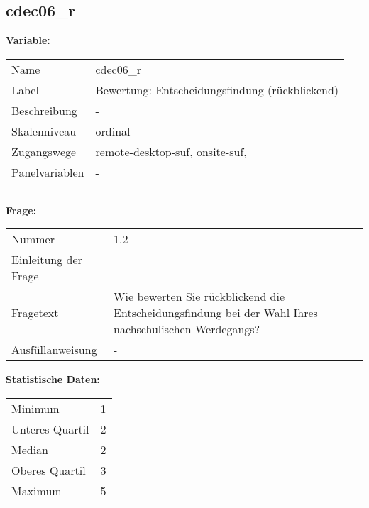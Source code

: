 	
	
	\subsection{cdec06\_r}
	\label{subSection:cdec06_r}

	\noindent\textbf{Variable:}\\
		\begin{tabular}{lL{11.3cm}}
			\label{tableVariable:cdec06_r}
			Name & cdec06\_r \\
			Label & Bewertung: Entscheidungsfindung (rückblickend) \\
			Beschreibung & - \\
			Skalenniveau & ordinal \\
			Zugangswege &
				remote-desktop-suf,
				onsite-suf,
 \\
			Panelvariablen & -
			 \\
			 \\
 \\
		\end{tabular}

		\vspace*{1 cm}
		\noindent\textbf{Frage:}\\
		\begin{tabular}{lL{11.3cm}}
			\label{tableQuestion:cdec06_r}
			Nummer & 1.2 \\
			Einleitung der Frage & - \\
			Fragetext & Wie bewerten Sie rückblickend die Entscheidungsfindung bei der Wahl Ihres nachschulischen Werdegangs? \\
			Ausfüllanweisung & - \\
		\end{tabular}


		\vspace*{1 cm}
		\noindent\textbf{Statistische Daten:}\\
			\begin{tabular}{ll}
				\label{tableStatistics:cdec06_r}
					Minimum & 1 \\
					Unteres Quartil & 2 \\
					Median & 2 \\
					Oberes Quartil & 3 \\
					Maximum & 5 \\
			\end{tabular}



